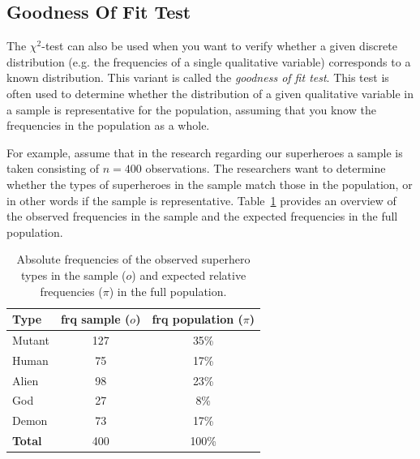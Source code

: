 \subsection{Goodness Of Fit Test}
\label{ssec:goodness-of-fit-test}

The $\chi^2$-test can also be used when you want to verify whether a given discrete distribution (e.g. the frequencies of a single qualitative variable) corresponds to a known distribution. This variant is called the \emph{goodness of fit test}. This test is often used to determine whether the distribution of a given qualitative variable in a sample is representative for the population, assuming that you know the frequencies in the population as a whole.

For example, assume that in the research regarding our superheroes a sample is taken consisting of $n = 400$ observations. The researchers want to determine whether the types of superheroes in the sample match those in the population, or in other words if the sample is representative. Table~\ref{tab:frequencies-types-superheroes} provides an overview of the observed frequencies in the sample and the expected frequencies in the full population.

\begin{table}
  \centering
  \begin{tabular}{@{}lcc@{}}
  	\toprule
  	\textbf{Type}   & \textbf{frq sample ($o$)} & \textbf{frq population ($\pi$)} \\
  	\midrule
  	Mutant          &              127              &              35\%              \\
  	Human           &              75               &              17\%              \\
  	Alien           &              98               &              23\%              \\
  	God             &              27               &              8\%               \\
  	Demon           &              73               &              17\%              \\
  	\midrule
  	\textbf{Total } &              400              &             100\%
  \end{tabular}
  \caption{Absolute frequencies of the observed superhero types in the sample ($o$) and expected relative frequencies ($\pi$) in the full population.}
  \label{tab:frequencies-types-superheroes}
\end{table}

